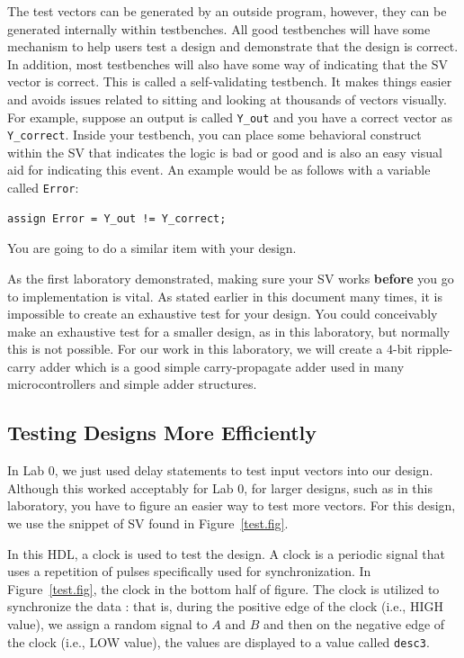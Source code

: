 \documentclass{article}
\begin{document}
The test vectors can be generated by an outside
program, however, they can be generated internally within
testbenches.  All good testbenches will have some mechanism to help
users test a design and demonstrate that the design is correct.
In addition, most
testbenches will also have some way of indicating that the SV vector
is correct.  This is called a self-validating testbench.  It makes
things easier and avoids issues related to sitting and looking at
thousands of vectors visually.  For example, suppose an output is
called \verb!Y_out! and you have a correct vector as
\verb!Y_correct!.  Inside your testbench, you can place some behavioral
construct within the SV that indicates the logic is bad or good and is
also an easy visual aid for indicating this event.  An
example would be as follows with a variable called \verb!Error!:
\begin{verbatim}
assign Error = Y_out != Y_correct;
\end{verbatim}
You are going to do a similar item with your design.

As the first laboratory demonstrated, making sure your SV works
\textbf{before} you go to implementation is vital.  As stated earlier
in this document many times, it is impossible to create an exhaustive
test for your design.  You could conceivably make an exhaustive test
for a smaller design, as in this laboratory, but normally this is not
possible.  For our work in this laboratory, we will create a $4$-bit
ripple-carry adder which is a good simple carry-propagate adder used
in many microcontrollers and simple adder structures.

\subsection{Testing Designs More Efficiently}

In Lab 0, we just used delay statements to test input vectors into our
design.  Although this worked acceptably for Lab 0, for larger designs, such
as in this laboratory, you have to figure an easier way to test more
vectors.  For this design, we use the snippet of SV found in
Figure~\ref{test.fig}.

In this HDL, a clock is used to test the
design.  A clock is a periodic signal that uses a repetition of pulses
specifically used for synchronization.  In Figure~\ref{test.fig}, the clock
in the bottom half of figure.  The clock
is utilized to synchronize the data : that is, during the positive edge of
the clock (i.e., HIGH value), we assign a random signal to $A$ and $B$
and then on the negative edge of the clock (i.e., LOW value), the
values are displayed to a value called \verb!desc3!.
\end{document}
